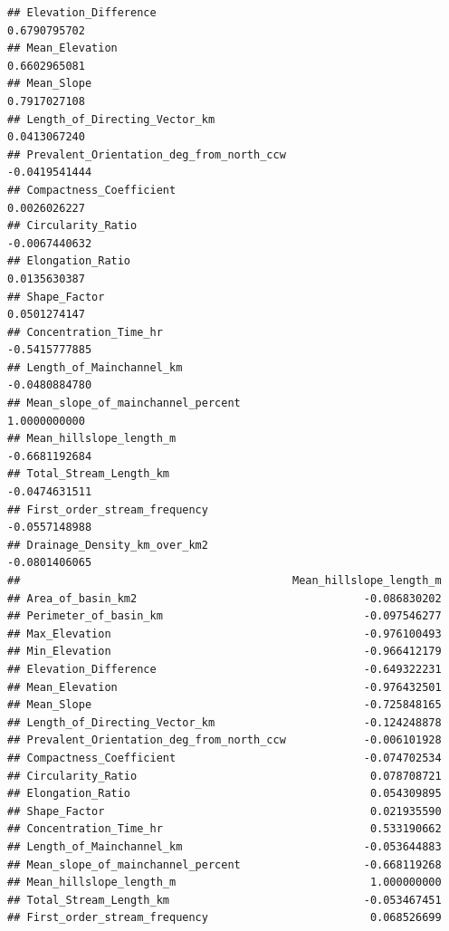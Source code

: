 \documentclass[11pt,]{article}
\begin{document}
\begin{verbatim}
## Elevation_Difference                                          0.6790795702
## Mean_Elevation                                                0.6602965081
## Mean_Slope                                                    0.7917027108
## Length_of_Directing_Vector_km                                 0.0413067240
## Prevalent_Orientation_deg_from_north_ccw                     -0.0419541444
## Compactness_Coefficient                                       0.0026026227
## Circularity_Ratio                                            -0.0067440632
## Elongation_Ratio                                              0.0135630387
## Shape_Factor                                                  0.0501274147
## Concentration_Time_hr                                        -0.5415777885
## Length_of_Mainchannel_km                                     -0.0480884780
## Mean_slope_of_mainchannel_percent                             1.0000000000
## Mean_hillslope_length_m                                      -0.6681192684
## Total_Stream_Length_km                                       -0.0474631511
## First_order_stream_frequency                                 -0.0557148988
## Drainage_Density_km_over_km2                                 -0.0801406065
##                                          Mean_hillslope_length_m
## Area_of_basin_km2                                   -0.086830202
## Perimeter_of_basin_km                               -0.097546277
## Max_Elevation                                       -0.976100493
## Min_Elevation                                       -0.966412179
## Elevation_Difference                                -0.649322231
## Mean_Elevation                                      -0.976432501
## Mean_Slope                                          -0.725848165
## Length_of_Directing_Vector_km                       -0.124248878
## Prevalent_Orientation_deg_from_north_ccw            -0.006101928
## Compactness_Coefficient                             -0.074702534
## Circularity_Ratio                                    0.078708721
## Elongation_Ratio                                     0.054309895
## Shape_Factor                                         0.021935590
## Concentration_Time_hr                                0.533190662
## Length_of_Mainchannel_km                            -0.053644883
## Mean_slope_of_mainchannel_percent                   -0.668119268
## Mean_hillslope_length_m                              1.000000000
## Total_Stream_Length_km                              -0.053467451
## First_order_stream_frequency                         0.068526699

\end{verbatim}
\end{document}

